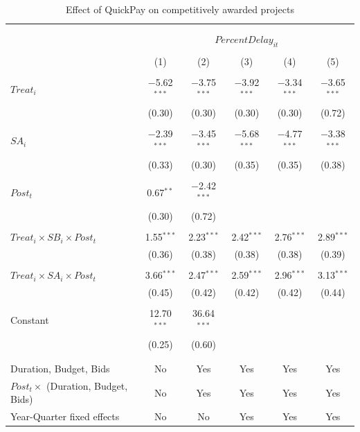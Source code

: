 \documentclass[
]{article}
\begin{document}
\begin{table}[H] \centering 
  \caption{Effect of QuickPay on competitively awarded projects} 
  \label{} 
\small 
\begin{tabular}{@{\extracolsep{-2pt}}lccccc} 
\\[-1.8ex]\hline 
\hline \\[-1.8ex] 
\\[-1.8ex] & \multicolumn{5}{c}{$PercentDelay_{it}$  } \\ 
\\[-1.8ex] & (1) & (2) & (3) & (4) & (5)\\ 
\hline \\[-1.8ex] 
 $Treat_i$ & $-$5.62$^{***}$ & $-$3.75$^{***}$ & $-$3.92$^{***}$ & $-$3.34$^{***}$ & $-$3.65$^{***}$ \\ 
  & (0.30) & (0.30) & (0.30) & (0.30) & (0.72) \\ 
  & & & & & \\ 
 $SA_i$ & $-$2.39$^{***}$ & $-$3.45$^{***}$ & $-$5.68$^{***}$ & $-$4.77$^{***}$ & $-$3.38$^{***}$ \\ 
  & (0.33) & (0.30) & (0.35) & (0.35) & (0.38) \\ 
  & & & & & \\ 
 $Post_t$ & 0.67$^{**}$ & $-$2.42$^{***}$ &  &  &  \\ 
  & (0.30) & (0.72) &  &  &  \\ 
  & & & & & \\ 
 $Treat_i \times SB_i \times Post_t$ & 1.55$^{***}$ & 2.23$^{***}$ & 2.42$^{***}$ & 2.76$^{***}$ & 2.89$^{***}$ \\ 
  & (0.36) & (0.38) & (0.38) & (0.38) & (0.39) \\ 
  & & & & & \\ 
 $Treat_i \times SA_i \times Post_t$ & 3.66$^{***}$ & 2.47$^{***}$ & 2.59$^{***}$ & 2.96$^{***}$ & 3.13$^{***}$ \\ 
  & (0.45) & (0.42) & (0.42) & (0.42) & (0.44) \\ 
  & & & & & \\ 
 Constant & 12.70$^{***}$ & 36.64$^{***}$ &  &  &  \\ 
  & (0.25) & (0.60) &  &  &  \\ 
  & & & & & \\ 
\hline \\[-1.8ex] 
Duration, Budget, Bids & No & Yes & Yes & Yes & Yes \\ 
$Post_t \times $  (Duration, Budget, Bids) & No & Yes & Yes & Yes & Yes \\ 
Year-Quarter fixed effects & No & No & Yes & Yes & Yes \\ 

\end{tabular}
\end{table}
\end{document}
